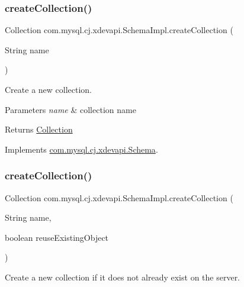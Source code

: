 \subsubsection{\texorpdfstring{create\+Collection()}{createCollection()}\hspace{0.1cm}{\footnotesize\ttfamily [1/2]}}
{\footnotesize\ttfamily Collection com.\+mysql.\+cj.\+xdevapi.\+Schema\+Impl.\+create\+Collection (\begin{DoxyParamCaption}\item[{String}]{name }\end{DoxyParamCaption})}

Create a new collection.


\begin{DoxyParams}{Parameters}
{\em name} & collection name \\
\hline
\end{DoxyParams}
\begin{DoxyReturn}{Returns}
\mbox{\hyperlink{interfacecom_1_1mysql_1_1cj_1_1xdevapi_1_1_collection}{Collection}} 
\end{DoxyReturn}


Implements \mbox{\hyperlink{interfacecom_1_1mysql_1_1cj_1_1xdevapi_1_1_schema_a40a19a9c1a57c92b4197c545d21f11ea}{com.\+mysql.\+cj.\+xdevapi.\+Schema}}.

\mbox{\label{classcom_1_1mysql_1_1cj_1_1xdevapi_1_1_schema_impl_a723a878ef263bfeec2efcf434849da84}} 
\subsubsection{\texorpdfstring{create\+Collection()}{createCollection()}\hspace{0.1cm}{\footnotesize\ttfamily [2/2]}}
{\footnotesize\ttfamily Collection com.\+mysql.\+cj.\+xdevapi.\+Schema\+Impl.\+create\+Collection (\begin{DoxyParamCaption}\item[{String}]{name,  }\item[{boolean}]{reuse\+Existing\+Object }\end{DoxyParamCaption})}

Create a new collection if it does not already exist on the server.


